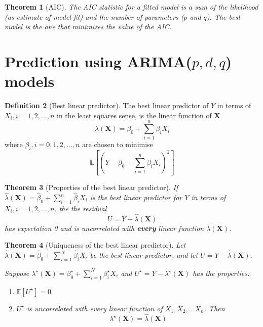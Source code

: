 \documentclass[10pt, oneside, reqno]{amsart}
\theoremstyle{plain}%
\newtheorem{thm}{Theorem}[section]
\theoremstyle{definition}
\newtheorem{defn}[thm]{Definition}
\theoremstyle{remark}
\newcommand{\expc}[1]{\mathbb{E}\left[#1\right]}
\begin{document}
\begin{thm}[AIC]
	The AIC statistic for a fitted model is a sum of the likelihood (as estimate of model fit) and the number of parameters ($p$ and $q$).  The \emph{best} model is the one that minimizes the value of the AIC.
\end{thm}


\section{Prediction using ARIMA($p,d,q$) models} %
\label{sec:prediction_using_arima_p_d_q_models}

\begin{defn}[Best linear predictor]
	The best linear predictor of $Y$ in terms of $X_i, i = 1,2,\dots, n$ in the least squares sense, is the linear function of $\mathbf{X}$\[
		\lambda(\mathbf{X}) = \beta_0 + \sum_{i = 1}^n \beta_i X_i
	\] where $\beta_i, i = 0,1,2,\dots,n$ are chosen to minimise \[
		\expc{\left(Y - \beta_0 - \sum_{i=1}^n \beta_i X_i\right)^2}
	\]
\end{defn}
	
\begin{thm}[Properties of the best linear predictor]
	If $\hat \lambda(\mathbf{X}) = \hat \beta_0 + \sum_{i=1}^n \hat \beta_i X_i$ is the best linear predictor for $Y$ in terms of $X_i, i = 1,2,\dots,n$, the the residual \[
		U = Y - \hat \lambda(\mathbf{X})
	\] has expectation 0 and is uncorrelated with \textbf{every} linear function $\lambda(\mathbf{X})$.
\end{thm}	

\begin{thm}[Uniqueness of the best linear predictor]
	Let $\hat \lambda(\mathbf{X}) = \hat \beta_0 + \sum_{i=1}^N \hat \beta_i X_i $ be the best linear predictor, and let $U  = Y - \hat \lambda(\mathbf{X})$.  
	
	Suppose $\lambda^\star(\mathbf{X}) = \beta_0^\star + \sum_{i=1}^N \beta_i^\star X_i$ and $U^\star = Y - \lambda^\star (\mathbf{X})$ has the properties:
	\begin{enumerate}
		\item $\expc{U^\star} = 0$
		\item $U^\star$ is uncorrelated with every linear function of $X_1, X_2, \dots X_n$.  Then
		\[
			\lambda^\star(\mathbf{X}) = \hat \lambda(\mathbf{X})
		\]
	\end{enumerate}
\end{thm}
	
\end{document}
